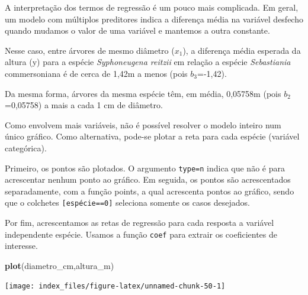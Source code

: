 \documentclass[12pt,brazil,oneside]{book}
\newenvironment{Shaded}{\begin{snugshade}}{\end{snugshade}}
\newcommand{\KeywordTok}[1]{\textcolor[rgb]{0.13,0.29,0.53}{\textbf{#1}}}
\newcommand{\NormalTok}[1]{#1}
\begin{document}
A interpretação dos termos de regressão é um pouco mais complicada. Em geral, um modelo com múltiplos preditores indica a diferença média na variável desfecho quando mudamos o valor de uma variável e mantemos a outra constante.

Nesse caso, entre árvores de mesmo diâmetro (\(x_1\)), a diferença média esperada da altura (y) para a espécie \emph{Syphoneugena reitzii} em relação a espécie \emph{Sebastiania} commersoniana é de cerca de 1,42m a menos (pois \(b_3\)=-1,42).

Da mesma forma, árvores da mesma espécie têm, em média, 0,05758m (pois \(b_2\)=0,05758) a mais a cada 1 cm de diâmetro.

Como envolvem mais variáveis, não é possível resolver o modelo inteiro num único gráfico. Como alternativa, pode-se plotar a reta para cada espécie (variável categórica).

Primeiro, os pontos são plotados. O argumento \texttt{type=\textquotesingle{}n\textquotesingle{}} indica que não é para acrescentar nenhum ponto ao gráfico.
Em seguida, os pontos são acrescentados separadamente, com a função points, a qual acrescenta pontos ao gráfico, sendo que o colchetes \texttt{{[}espécie==0{]}} seleciona somente os casos desejados.

Por fim, acrescentamos as retas de regressão para cada resposta a variável independente espécie. Usamos a função \texttt{coef} para extrair os coeficientes de interesse.

\begin{Shaded}
\begin{Highlighting}[]
\KeywordTok{plot}\NormalTok{(diametro_cm,altura_m)}
\end{Highlighting}
\end{Shaded}

\begin{center}\texttt{[image: index\_files/figure-latex/unnamed-chunk-50-1]} \end{center}
\end{document}
